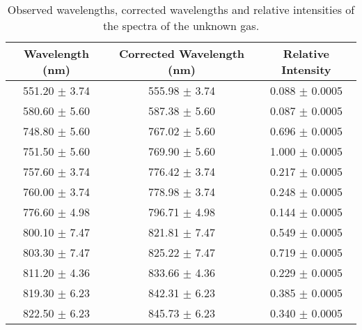 \begin{table}
    \begin{adjustbox}{width=0.7\textwidth, center}
        \begin{tabular}{|c|c|c|}
            \hline
            Wavelength (nm)   & Corrected Wavelength (nm) & Relative Intensity  \\
            \hline
            551.20 $\pm$ 3.74 & 555.98 $\pm$ 3.74         & 0.088  $\pm$ 0.0005 \\
            580.60 $\pm$ 5.60 & 587.38 $\pm$ 5.60         & 0.087  $\pm$ 0.0005 \\
            748.80 $\pm$ 5.60 & 767.02 $\pm$ 5.60         & 0.696  $\pm$ 0.0005 \\
            751.50 $\pm$ 5.60 & 769.90 $\pm$ 5.60         & 1.000  $\pm$ 0.0005 \\
            757.60 $\pm$ 3.74 & 776.42 $\pm$ 3.74         & 0.217  $\pm$ 0.0005 \\
            760.00 $\pm$ 3.74 & 778.98 $\pm$ 3.74         & 0.248  $\pm$ 0.0005 \\
            776.60 $\pm$ 4.98 & 796.71 $\pm$ 4.98         & 0.144  $\pm$ 0.0005 \\
            800.10 $\pm$ 7.47 & 821.81 $\pm$ 7.47         & 0.549  $\pm$ 0.0005 \\
            803.30 $\pm$ 7.47 & 825.22 $\pm$ 7.47         & 0.719  $\pm$ 0.0005 \\
            811.20 $\pm$ 4.36 & 833.66 $\pm$ 4.36         & 0.229  $\pm$ 0.0005 \\
            819.30 $\pm$ 6.23 & 842.31 $\pm$ 6.23         & 0.385  $\pm$ 0.0005 \\
            822.50 $\pm$ 6.23 & 845.73 $\pm$ 6.23         & 0.340  $\pm$ 0.0005 \\
            \hline
        \end{tabular}
    \end{adjustbox}
    \caption{Observed wavelengths, corrected wavelengths and relative intensities of the spectra of the unknown gas.}
    \label{tab:unknown}
\end{table}